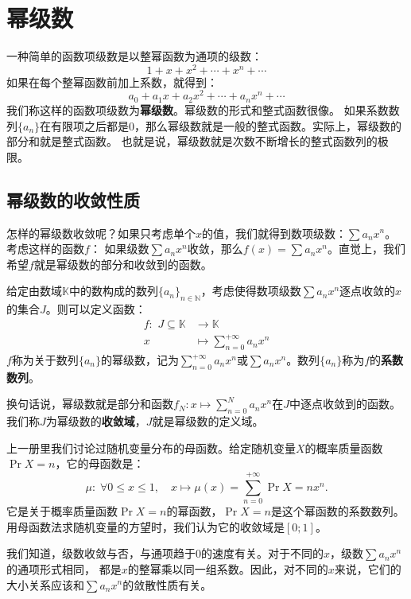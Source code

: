 \documentclass[12pt,UTF8,fontset=none]{ctexbook}
\begin{document}
\chapter{幂级数}

一种简单的函数项级数是以整幂函数为通项的级数：
$$ 1 + x + x^2 + \cdots + x^n + \cdots$$
如果在每个整幂函数前加上系数，就得到：
$$ a_0 + a_1x + a_2x^2 + \cdots + a_n x^n + \cdots$$
我们称这样的函数项级数为\textbf{幂级数}。幂级数的形式和整式函数很像。
如果系数数列$\{a_n\}$在有限项之后都是$0$，那么幂级数就是一般的整式函数。实际上，幂级数的部分和就是整式函数。
也就是说，幂级数就是次数不断增长的整式函数列的极限。

\section{幂级数的收敛性质}

怎样的幂级数收敛呢？如果只考虑单个$x$的值，我们就得到数项级数：$\sum a_n x^n$。考虑这样的函数$f$：
如果级数$\sum a_n x^n$收敛，那么$f(x) = \sum a_n x^n$。直觉上，我们希望$f$就是幂级数的部分和收敛到的函数。

\begin{df}
    给定由数域$\mathbb{K}$中的数构成的数列$\{a_n\}_{n\in\mathbb{N}}$，考虑使得数项级数$\sum a_n x^n$逐点收敛的$x$的集合$J$。则可以定义函数：
    $$
    \begin{array}{rl}
        f: \,\, J\subseteq \mathbb{K} &\rightarrow \mathbb{K} \\
        x &\displaystyle \mapsto \sum_{n=0}^{+\infty} a_n x^n        
    \end{array}
    $$
    $f$称为关于数列$\{a_n\}$的幂级数，记为$\sum_{n=0}^{+\infty} a_n x^n$或$\sum a_n x^n$。数列$\{a_n\}$称为$f$的\textbf{系数数列}。
\end{df}
换句话说，幂级数就是部分和函数$f_N : x\mapsto \sum_{n=0}^{N} a_n x^n$在$J$中逐点收敛到的函数。
我们称$J$为幂级数的\textbf{收敛域}，$J$就是幂级数的定义域。

\begin{ex}
    上一册里我们讨论过随机变量分布的母函数。给定随机变量$X$的概率质量函数$\Pr{X=n}$，它的母函数是：
    $$ \mu: \; \forall 0\leqslant x\leqslant 1, \quad x\mapsto \mu(x) = \sum_{n=0}^{+\infty} \Pr{X=n} x^n. $$
    它是关于概率质量函数$\Pr{X=n}$的幂函数，$\Pr{X=n}$是这个幂函数的系数数列。用母函数法求随机变量的方望时，我们认为它的收敛域是$[0;1]$。
\end{ex}

我们知道，级数收敛与否，与通项趋于$0$的速度有关。对于不同的$x$，级数$\sum a_n x^n$的通项形式相同，
都是$x$的整幂乘以同一组系数。因此，对不同的$x$来说，它们的大小关系应该和$\sum a_n x^n$的敛散性质有关。
\end{document}
